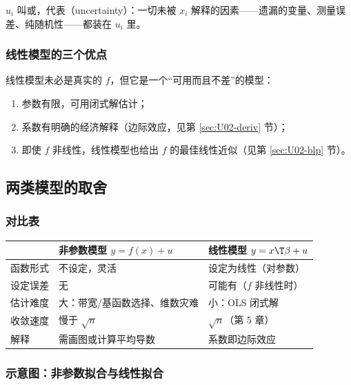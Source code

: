 $u_i$ 叫或，代表（uncertainty）：一切未被 $x_i$ 解释的因素——遗漏的变量、测量误差、纯随机性——都装在 $u_i$ 里。

\subsubsection{线性模型的三个优点}

线性模型未必是真实的 $f$，但它是一个“可用而且不差”的模型：
\begin{enumerate}[label=(\roman*)]
  \item 参数有限，可用闭式解估计；
  \item 系数有明确的经济解释（边际效应，见第 \ref{sec:U02-deriv} 节）；
  \item 即使 $f$ 非线性，线性模型也给出 $f$ 的最佳线性近似（见第 \ref{sec:U02-blp} 节）。
\end{enumerate}

\subsection{两类模型的取舍}

\subsubsection{对比表}

\begin{center}
\small
\begin{tabularx}{\linewidth}{lLL}
\toprule
 & 非参数模型 $y=f(x)+u$ & 线性模型 $y=x\T\beta+u$\\
\midrule
函数形式 & 不设定，灵活 & 设定为线性（对参数）\\
设定误差 & 无 & 可能有（$f$ 非线性时）\\
估计难度 & 大：带宽/基函数选择、维数灾难 & 小：OLS 闭式解\\
收敛速度 & 慢于 $\sqrt n$ & $\sqrt n$（第 5 章）\\
解释 & 需画图或计算平均导数 & 系数即边际效应\\
\bottomrule
\end{tabularx}
\end{center}

\subsubsection{示意图：非参数拟合与线性拟合}

